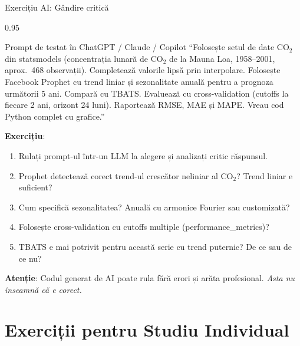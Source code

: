 \documentclass[9pt, aspectratio=169, t]{beamer}
\begin{document}
\begin{frame}{Exercițiu AI: Gândire critică}
    \begin{cminipage}{0.95\textwidth}
    \vspace{-3mm}
    \begin{block}{\footnotesize Prompt de testat în ChatGPT / Claude / Copilot}
        {\footnotesize
        ``Folosește setul de date CO$_2$ din statsmodels (concentrația lunară de CO$_2$ de la Mauna Loa, 1958--2001, aprox.\ 468 observații). Completează valorile lipsă prin interpolare. Folosește Facebook Prophet cu trend liniar și sezonalitate anuală pentru a prognoza următorii 5 ani. Compară cu TBATS. Evaluează cu cross-validation (cutoffs la fiecare 2 ani, orizont 24 luni). Raportează RMSE, MAE și MAPE. Vreau cod Python complet cu grafice.''
        }
    \end{block}
    \vspace{-2mm}
    {\footnotesize
    \textbf{Exercițiu}:
    \begin{enumerate}\setlength{\itemsep}{0pt}
        \item Rulați prompt-ul într-un LLM la alegere și analizați critic răspunsul.
        \item Prophet detectează corect trend-ul crescător neliniar al CO$_2$? Trend liniar e suficient?
        \item Cum specifică sezonalitatea? Anuală cu armonice Fourier sau customizată?
        \item Folosește cross-validation cu cutoffs multiple (performance\_metrics)?
        \item TBATS e mai potrivit pentru această serie cu trend puternic? De ce sau de ce nu?
    \end{enumerate}
    }
    \vspace{-2mm}
    \begin{alertblock}{}
        {\footnotesize \textbf{Atenție}: Codul generat de AI poate rula fără erori și arăta profesional. \textit{Asta nu înseamnă că e corect.}}
    \end{alertblock}
    \end{cminipage}
\end{frame}

\section{Exerciții pentru Studiu Individual}
\end{document}
